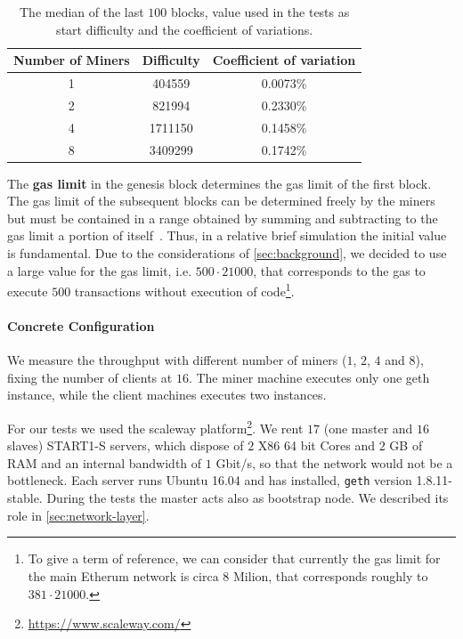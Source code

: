 \begin{table}
    \begin{center}
        \begin{tabular}{c | c | c}
            Number of Miners & Difficulty & Coefficient of variation \\
            \hline
            1 &  404559 & 0.0073\% \\
            2 &  821994 & 0.2330\%\\
            4 & 1711150 & 0.1458\%\\
            8 & 3409299 & 0.1742\%\\
        \end{tabular}
        \caption{The median of the last $100$ blocks, value used in the tests as
            start difficulty and the coefficient of variations.}
        \label{table:start-difficulty}
    \end{center}
\end{table}


The \textbf{gas limit} in the genesis block determines the gas limit of the
first block. The gas limit of the subsequent blocks can be determined freely by
the miners but must be contained in a range obtained by summing and subtracting
to the gas limit a portion of itself~\cite{wood2018ethereum}. Thus, in a
relative brief simulation the initial value is fundamental. Due to the
considerations of \autoref{sec:background}, we decided to use a large value for
the gas limit, i.e. $500 \cdot 21000$, that corresponds to the gas to execute
$500$ transactions without execution of code\footnote{To give a term of
reference, we can consider that currently the gas limit for the main Etherum
network is circa $8$ Milion, that corresponds roughly to $381 \cdot 21000$.}.



\paragraph{Concrete Configuration}
We measure the throughput with different number of miners ($1$, $2$, $4$ and 
$8$), fixing the number of clients at $16$. The miner machine executes only one
geth instance, while the client machines executes two instances.

For our tests we used the scaleway
platform\footnote{\url{https://www.scaleway.com/}}. We rent $17$ (one master
and $16$ slaves) START1-S servers,
which dispose of $2$ X86 64 bit Cores and $2$ GB of RAM and an internal
bandwidth of $1$ Gbit/s, so that the network would not be a bottleneck. Each
server runs Ubuntu 16.04 and has installed, \texttt{geth} version 1.8.11-stable.
During the tests the master acts also as bootstrap node. We described its role
in \autoref{sec:network-layer}.

